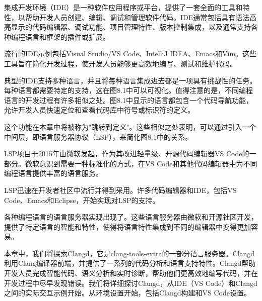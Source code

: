 集成开发环境（IDE）是一种软件应用程序或平台，提供了一套全面的工具和特性，以帮助开发人员创建、编辑、调试和管理软件代码。IDE通常包括具有语法高亮显示的代码编辑器、调试功能、项目管理特性、版本控制集成，以及通常支持各种编程语言和框架的插件或扩展。

流行的IDE示例包括Visual Studio/VS Code、IntelliJ IDEA、Emacs和Vim。这些工具旨在简化开发过程，使开发人员能够更高效地编写、测试和维护代码。

典型的IDE支持多种语言，并且将每种语言集成进去都是一项具有挑战性的任务。每种语言都需要特定的支持，这在图8.1中可以可视化。值得注意的是，不同编程语言的开发过程有许多相似之处。图8.1中显示的语言都包含一个代码导航功能，允许开发人员快速定位和查看代码库中符号或标识符的定义。


这个功能在本章中将被称为"跳转到定义"。这些相似之处表明，可以通过引入一个中间层，即语言服务器协议（LSP），来简化图8.1中的关系。


LSP项目于2015年由微软发起，作为其改进轻量级、开源代码编辑器VS Code的一部分。微软意识到需要一种标准化的方式，在VS Code和其他代码编辑器中为不同编程语言提供丰富的语言服务。

LSP迅速在开发者社区中流行并得到采用。许多代码编辑器和IDE，包括VS Code、Emacs和Eclipse，开始实现对LSP的支持。

各种编程语言的语言服务器实现出现了。这些语言服务器由微软和开源社区开发，提供了特定语言的智能和特性，使得将语言特性集成到不同的编辑器中变得更加容易。

本章中，我们将探索Clangd，它是clang-tools-extra的一部分语言服务器。Clangd利用Clang编译器前端，并提供了一系列的代码分析和语言支持特性。Clangd帮助开发人员完成智能代码、语义分析和实时诊断，帮助他们更高效地编写代码，并在开发过程中尽早发现错误。我们将详细探讨Clangd，从IDE（VS Code）和Clangd之间的实际交互示例开始。从环境设置开始，包括Clangd构建和VS Code设置。
































